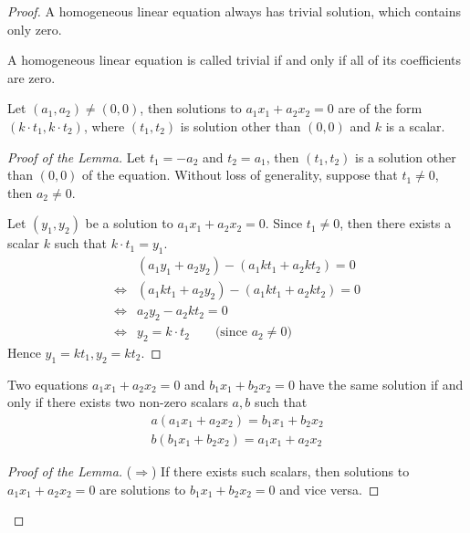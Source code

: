 \begin{proof}
	A homogeneous linear equation always has trivial solution, which contains only zero.

	A homogeneous linear equation is called trivial if and only if all of its coefficients are zero.

	\begin{lemma}\label{lemma:exercise:solution-to-homogeneous-linear-equation}
		Let $(a_{1}, a_{2})\ne (0, 0)$, then solutions to $a_{1}x_{1} + a_{2}x_{2} = 0$ are of the form $(k\cdot t_{1}, k\cdot t_{2})$, where $(t_{1}, t_{2})$ is solution other than $(0, 0)$ and $k$ is a scalar.
	\end{lemma}
	\begin{proof}[Proof of the Lemma]
		Let $t_{1} = -a_{2}$ and $t_{2} = a_{1}$, then $(t_{1}, t_{2})$ is a solution other than $(0, 0)$ of the equation. Without loss of generality, suppose that $t_{1}\ne 0$, then $a_{2}\ne 0$.

		Let $(y_{1}, y_{2})$ be a solution to $a_{1}x_{1} + a_{2}x_{2} = 0$. Since $t_{1}\ne 0$, then there exists a scalar $k$ such that $k\cdot t_{1} = y_{1}$.
		\begin{align*}
			                & (a_{1}y_{1} + a_{2}y_{2}) - (a_{1}kt_{1} + a_{2}kt_{2}) = 0  \\
			\Leftrightarrow & (a_{1}kt_{1} + a_{2}y_{2}) - (a_{1}kt_{1} + a_{2}kt_{2}) = 0 \\
			\Leftrightarrow & a_{2}y_{2} - a_{2}kt_{2} = 0                                 \\
			\Leftrightarrow & y_{2} = k\cdot t_{2} \qquad\text{(since $a_{2}\ne 0$)}
		\end{align*}
		Hence $y_{1} = kt_{1}, y_{2} = kt_{2}$.
	\end{proof}

	\begin{lemma}\label{lemma:exercise:equivalent-homogeneous-linear-equations}
		Two equations $a_{1}x_{1} + a_{2}x_{2} = 0$ and $b_{1}x_{1} + b_{2}x_{2} = 0$ have the same solution if and only if there exists two non-zero scalars $a, b$ such that
		\[
			\begin{split}
				a(a_{1}x_{1} + a_{2}x_{2}) = b_{1}x_{1} + b_{2}x_{2} \\
				b(b_{1}x_{1} + b_{2}x_{2}) = a_{1}x_{1} + a_{2}x_{2}
			\end{split}
		\]
	\end{lemma}
	\begin{proof}[Proof of the Lemma]
		($\Rightarrow$) If there exists such scalars, then solutions to $a_{1}x_{1} + a_{2}x_{2} = 0$ are solutions to $b_{1}x_{1} + b_{2}x_{2} = 0$ and vice versa.


\end{proof}
\end{proof}
